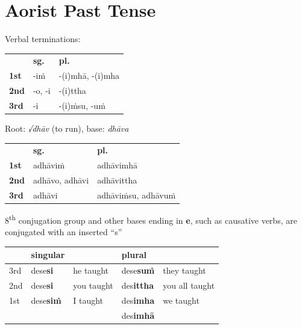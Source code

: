 \documentclass[11pt,oneside]{memoir}
\begin{document}
\clearpage

\section{Aorist Past Tense}
\label{sec:orgd8793c9}

{\centering\par
\begin{multicols}{2}

Verbal terminations:

\begin{center}
\begin{tabular}{lll}
 & \textbf{sg.} & \textbf{pl.}\\[0pt]
\textbf{1st} & -iṁ & -(i)mhā, -(i)mha\\[0pt]
\textbf{2nd} & -o, -i & -(i)ttha\\[0pt]
\textbf{3rd} & -i & -(i)ṁsu, -uṁ\\[0pt]
\end{tabular}
\end{center}

\columnbreak

Root: \emph{√dhāv} (to run), base: \emph{dhāva}

\begin{center}
\begin{tabular}{lll}
 & \textbf{sg.} & \textbf{pl.}\\[0pt]
\textbf{1st} & adhāviṁ & adhāvimhā\\[0pt]
\textbf{2nd} & adhāvo, adhāvi & adhāvittha\\[0pt]
\textbf{3rd} & adhāvi & adhāviṁsu, adhāvuṁ\\[0pt]
\end{tabular}
\end{center}

\end{multicols}
\par}

8\textsuperscript{th} conjugation group and other bases ending in \textbf{e}, such as causative verbs, are conjugated with an inserted “s”

\begin{center}
\begin{tabular}{lllll}
 & singular &  & plural & \\[0pt]
\hline
3rd & dese\textbf{si} & he taught & dese\textbf{suṁ} & they taught\\[0pt]
2nd & dese\textbf{si} & you taught & des\textbf{ittha} & you all taught\\[0pt]
1st & dese\textbf{siṁ} & I taught & des\textbf{imha} & we taught\\[0pt]
 &  &  & des\textbf{imhā} & \\[0pt]
\end{tabular}
\end{center}
\end{document}
